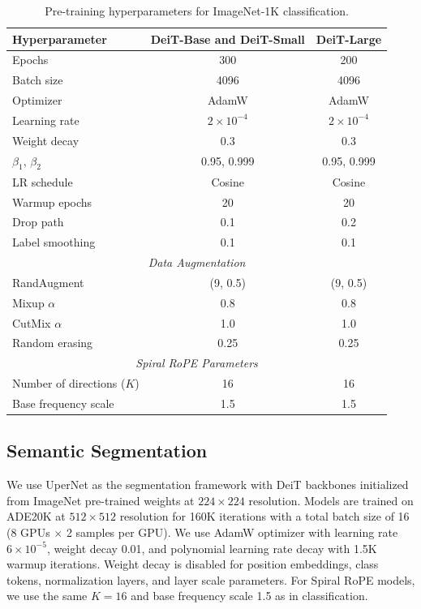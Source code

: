 \begin{table}[h]
    \caption{Pre-training hyperparameters for ImageNet-1K classification.}
    \label{tab:pretrain_hyperparams}
    \begin{center}
        \begin{tabular}{lcc}
            \toprule
            Hyperparameter & DeiT-Base and DeiT-Small & DeiT-Large \\
            \midrule
            Epochs & 300 & 200 \\
            Batch size & 4096 & 4096 \\
            Optimizer & AdamW & AdamW \\
            Learning rate & $2 \times 10^{-4}$ & $2 \times 10^{-4}$ \\
            Weight decay & 0.3 & 0.3 \\
            $\beta_1$, $\beta_2$ & 0.95, 0.999 & 0.95, 0.999 \\
            LR schedule & Cosine & Cosine \\
            Warmup epochs & 20 & 20 \\
            Drop path & 0.1 & 0.2 \\
            Label smoothing & 0.1 & 0.1 \\
            \midrule
            \multicolumn{3}{c}{\textit{Data Augmentation}} \\
            \midrule
            RandAugment & (9, 0.5) & (9, 0.5) \\
            Mixup $\alpha$ & 0.8 & 0.8 \\
            CutMix $\alpha$ & 1.0 & 1.0 \\
            Random erasing & 0.25 & 0.25 \\
            \midrule
            \multicolumn{3}{c}{\textit{Spiral RoPE Parameters}} \\
            \midrule
            Number of directions ($K$) & 16 & 16 \\
            Base frequency scale & 1.5 & 1.5 \\
            \bottomrule
        \end{tabular}
    \end{center}
\end{table}

\subsection{Semantic Segmentation}
We use UperNet as the segmentation framework with DeiT backbones initialized from ImageNet pre-trained weights at $224 \times 224$ resolution. Models are trained on ADE20K at $512 \times 512$ resolution for 160K iterations with a total batch size of 16 (8 GPUs $\times$ 2 samples per GPU). We use AdamW optimizer with learning rate $6 \times 10^{-5}$, weight decay 0.01, and polynomial learning rate decay with 1.5K warmup iterations. Weight decay is disabled for position embeddings, class tokens, normalization layers, and layer scale parameters. For Spiral RoPE models, we use the same $K=16$ and base frequency scale 1.5 as in classification.


